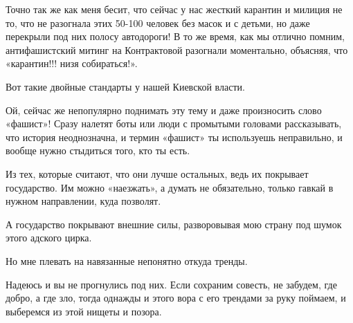 Точно так же как меня бесит, что сейчас у нас жесткий карантин и милиция не то,
что не разогнала этих 50-100 человек без масок и с детьми, но даже перекрыли
под них полосу автодороги! В то же время, как мы отлично помним, антифашистский
митинг на Контрактовой разогнали моментально, объясняя, что «карантин!!! низя
собираться!».

Вот такие двойные стандарты у нашей Киевской власти. 

Ой, сейчас же непопулярно поднимать эту тему и даже произносить слово «фашист»!
Сразу налетят боты или люди с промытыми головами рассказывать, что история
неоднозначна, и термин «фашист» ты используешь неправильно, и вообще нужно
стыдиться того, кто ты есть.

Из тех, которые считают, что они лучше остальных, ведь их покрывает
государство. Им можно «наезжать», а думать не обязательно, только гавкай в
нужном направлении, куда позволят. 

А государство покрывают внешние силы, разворовывая мою страну под шумок этого
адского цирка. 

Но мне плевать на навязанные непонятно откуда тренды. 

Надеюсь и вы не прогнулись под них. Если сохраним совесть, не забудем, где
добро, а где зло, тогда однажды и этого вора с его трендами за руку поймаем, и
выберемся из этой нищеты и позора.
